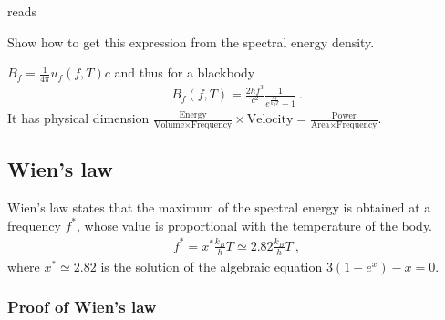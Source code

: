\documentclass[letterpaper,10pt,english]{jupyterBook}
\begin{document}
\sphinxAtStartPar
{} reads%
\begin{footnote}[1]\sphinxAtStartFootnote
Show how to get this expression from the spectral energy density.
%
\end{footnote} \(B_f = \frac{1}{4 \pi} u_f(f,T) c\) and thus for a black\sphinxhyphen{}body
\begin{equation*}
\begin{split}B_{f}(f, T) = \frac{2 h f^3}{c^2}\frac{1}{e^{\frac{hf}{k_B T}} - 1} \ .\end{split}
\end{equation*}
\sphinxAtStartPar
It has physical dimension \(\frac{\text{Energy}}{\text{Volume} \times \text{Frequency}} \times \text{Velocity} = \frac{\text{Power}}{\text{Area} \times \text{Frequency}}\).


\subsection{Wien’s law}
\label{\detokenize{ch/heat-transfer-radiation:wien-s-law}}\label{\detokenize{ch/heat-transfer-radiation:classical-thermodynamics-heat-transmission-radiation-wien}}
\sphinxAtStartPar
Wien’s law states that the maximum of the spectral energy is obtained at a frequency \(f^*\), whose value is proportional with the temperature of the body.
\begin{equation*}
\begin{split}f^* = x^* \frac{k_B}{h} T \simeq 2.82  \frac{k_B}{h} T \ ,\end{split}
\end{equation*}
\sphinxAtStartPar
where \(x^* \simeq 2.82\) is the solution of the algebraic equation \(3(1-e^x)-x=0\).
\subsubsection*{Proof of Wien’s law}
\end{document}
